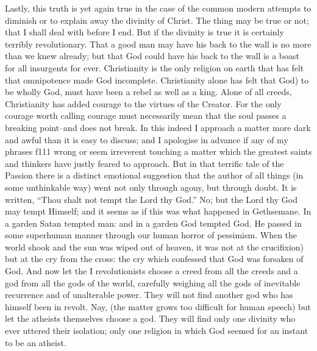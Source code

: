 \documentclass{book}
\begin{document}
Lastly, this truth is yet again true in the case of the common modern attempts to diminish or to explain away the divinity of Christ. The thing may be true or not; that I shall deal with before I end. But if the divinity is true it is certainly terribly revolutionary. That a good man may have his back to the wall is no more than we knew already; but that God could have his back to the wall is a boast for all insurgents for ever. Christianity is the only religion on earth that has felt that omnipotence made God incomplete. Christianity alone has felt that God) to be wholly God, must have been a rebel as well as a king. Alone of all creeds, Christianity has added courage to the virtues of the Creator. For the only courage worth calling courage must necessarily mean that the soul passes a breaking point–and does not break. In this indeed I approach a matter more dark and awful than it is easy to discuss; and I apologise in advance if any of my phrases f111 wrong or seem irreverent touching a matter which the greatest saints and thinkers have justly feared to approach. But in that terrific tale of the Passion there is a distinct emotional suggestion that the author of all things (in some unthinkable way) went not only through agony, but through doubt. It is written, “Thou shalt not tempt the Lord thy God.” No; but the Lord thy God may tempt Himself; and it seems as if this was what happened in Gethsemane. In a garden Satan tempted man: and in a garden God tempted God. He passed in some superhuman manner through our human horror of pessimism. When the world shook and the sun was wiped out of heaven, it was not at the crucifixion) but at the cry from the cross: the cry which confessed that God was forsaken of God. And now let the I revolutionists choose a creed from all the creeds and a god from all the gods of the world, carefully weighing all the gods of inevitable recurrence and of unalterable power. They will not find another god who has himself been in revolt. Nay, (the matter grows too difficult for human speech) but let the atheists themselves choose a god. They will find only one divinity who ever uttered their isolation; only one religion in which God seemed for an instant to be an atheist.
\end{document}
